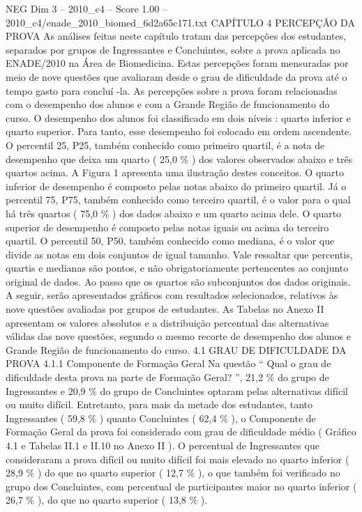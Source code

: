 \begin{textsample}{NEG Dim 3 – 2010\_c4 – Score 1.00 – 2010\_c4/enade\_2010\_biomed\_6d2a65c171.txt}  \label{ex:f3_neg_116}
CAPÍTULO 4 PERCEPÇÃO DA PROVA As análises feitas neste capítulo tratam das percepções dos estudantes, separados por grupos de Ingressantes e Concluintes, sobre a prova aplicada no ENADE/2010 na Área de Biomedicina.
Estas percepções foram mensuradas por meio de nove questões que avaliaram desde o grau de dificuldade da prova até o tempo gasto para concluí -la.
As percepções sobre a prova foram relacionadas com o desempenho dos alunos e com a Grande Região de funcionamento do curso.
O desempenho dos alunos foi classificado em dois níveis : quarto inferior e quarto superior.
Para tanto, esse desempenho foi colocado em ordem ascendente.
O percentil 25, P25, também conhecido como primeiro quartil, é a nota de desempenho que deixa um quarto ( 25,0 \% ) dos valores observados abaixo e três quartos acima.
A Figura 1 apresenta uma ilustração destes conceitos.
O quarto inferior de desempenho é composto pelas notas abaixo do primeiro quartil.
Já o percentil 75, P75, também conhecido como terceiro quartil, é o valor para o qual há três quartos ( 75,0 \% ) dos dados abaixo e um quarto acima dele.
O quarto superior de desempenho é composto pelas notas iguais ou acima do terceiro quartil.
O percentil 50, P50, também conhecido como mediana, é o valor que divide as notas em dois conjuntos de igual tamanho.
Vale ressaltar que percentis, quartis e medianas são pontos, e não obrigatoriamente pertencentes ao conjunto original de dados.
Ao passo que os quartos são subconjuntos dos dados originais.
A seguir, serão apresentados gráficos com resultados selecionados, relativos às nove questões avaliadas por grupos de estudantes.
As Tabelas no Anexo II apresentam os valores absolutos e a distribuição percentual das alternativas válidas das nove questões, segundo o mesmo recorte de desempenho dos alunos e Grande Região de funcionamento do curso. 4.1 GRAU DE DIFICULDADE DA PROVA 4.1.1 Componente de Formação Geral Na questão “ Qual o grau de dificuldade desta prova na parte de Formação Geral? ”, 21,2 \% do grupo de Ingressantes e 20,9 \% do grupo de Concluintes optaram pelas alternativas difícil ou muito difícil.
Entretanto, para mais da metade dos estudantes, tanto Ingressantes ( 59,8 \% ) quanto Concluintes ( 62,4 \% ), o Componente de Formação Geral da prova foi considerado com grau de dificuldade médio ( Gráfico 4.1 e Tabelas II.1 e II.10 no Anexo II ).
O percentual de Ingressantes que consideraram a prova difícil ou muito difícil foi mais elevado no quarto inferior ( 28,9 \% ) do que no quarto superior ( 12,7 \% ), o que também foi verificado no grupo dos Concluintes, com percentual de participantes maior no quarto inferior ( 26,7 \% ), do que no quarto superior ( 13,8 \% ).

\end{textsample}
